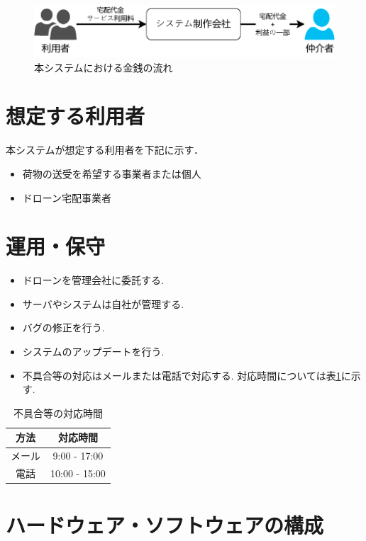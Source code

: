 \documentclass[a4paper, titlepage]{jsarticle}
\begin{document}
\begin{figure}[H]
  \centering
  \includegraphics[width=0.6\linewidth]{./money_flow.pdf}
  \caption{本システムにおける金銭の流れ}
  \label{fig:money_flow_1}
\end{figure}


\section{想定する利用者}
本システムが想定する利用者を下記に示す．
\begin{itemize}
        \item 荷物の送受を希望する事業者または個人
        \item ドローン宅配事業者
\end{itemize}

\section{運用・保守}
\begin{itemize}
\item ドローンを管理会社に委託する.
\item サーバやシステムは自社が管理する.
\item バグの修正を行う.
\item システムのアップデートを行う.
\item 不具合等の対応はメールまたは電話で対応する. 対応時間については表\ref{tb:huguai}に示す.
\end{itemize}

\begin{table}[htbp]
  \centering
  \begin{tabular}{c|c} \hline
    方法 & 対応時間 \\ \hline
    メール & 9:00 - 17:00 \\
    電話 & 10:00 - 15:00 \\ \hline
  \end{tabular}
  \caption{不具合等の対応時間}
  \label{tb:huguai}
\end{table}

\section{ハードウェア・ソフトウェアの構成}
\end{document}

